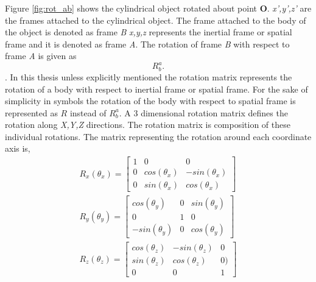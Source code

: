 Figure \ref{fig:rot_ab} shows the cylindrical object rotated about point \textbf{O}. \emph{x',y',z'} are the frames attached to the cylindrical object. The frame attached to the body of the object is denoted as frame \emph{B} \emph{x,y,z} represents the inertial frame or spatial frame and it is denoted as frame \emph{A}. The rotation of frame \emph{B} with respect to frame \emph{A} is given as $$ R_b^a.$$. In this thesis unless explicitly mentioned the rotation matrix represents the rotation of a body with respect to inertial frame or spatial frame. For the sake of simplicity in symbols the rotation of the body with respect to spatial frame is represented as $R$ instead of $R_b^a$.
A 3 dimensional rotation matrix defines the rotation along \emph{X,Y,Z} directions. The rotation matrix is composition of these individual rotations. The matrix representing the rotation around each coordinate axis is,
\begin{equation}
	\begin{split}
	R_x(\theta_x) = 
	\begin{bmatrix}
	1 &0 &0 \\ 0 &cos(\theta_x) &-sin(\theta_x)\\ 0 &sin(\theta_x) &cos(\theta_x)
	\end{bmatrix}\\
	R_y(\theta_y) = 
	\begin{bmatrix}
	cos(\theta_y) &0 &sin(\theta_y) \\ 0 &1 &0\\ -sin(\theta_y) &0 &cos(\theta_y)
	\end{bmatrix}\\
	R_z(\theta_z) = 
	\begin{bmatrix}
	cos(\theta_z) &-sin(\theta_z) &0 \\ sin(\theta_z) &cos(\theta_z) &0)\\ 0 &0 &1
	\end{bmatrix}
	\end{split}
\end{equation}
